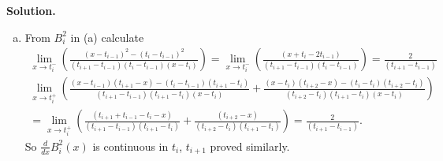\documentclass[a4paper]{book}
\newenvironment{solution}%
{\noindent\textbf{Solution.}}%
{\qedhere}
\numberwithin{equation}{chapter}
\theoremstyle{definition}
\begin{document}
\begin{solution}
\begin{enumerate}[(a)]
  \item From $B_i^2$ in (a) calculate
    \begin{align*}
      \lim\limits_{x \rightarrow t_i^-}(\frac{(x - t_{i-1})^2 - (t_i - t_{i-1})^2}{(t_{i+1} - t_{i-1})(t_i - t_{i-1})(x - t_i)}) =  \lim\limits_{x \rightarrow t_i^-}(\frac{(x + t_i - 2t_{i-1})}{(t_{i+1} - t_{i-1})(t_i - t_{i-1})}) = \frac{2}{(t_{i+1} - t_{i-1})} \\
      \lim\limits_{x \rightarrow t_i^+}( \frac{(x - t_{i-1})(t_{i+1} - x) - (t_i - t_{i-1})(t_{i+1} - t_i)}{(t_{i+1} - t_{i-1})(t_{i+1} - t_i)(x - t_{i})} + \frac{(x - t_{i})(t_{i+2} - x)- (t_i - t_{i})(t_{i+2} - t_i)}{(t_{i+2} - t_{i})(t_{i+1} - t_i)(x -t_{i})})\\
      = \lim\limits_{x \rightarrow t_i^+}( \frac{(t_{i+1} + t_{i-1} - t_i - x)}{(t_{i+1} - t_{i-1})(t_{i+1} - t_i)} + \frac{(t_{i+2} - x)}{(t_{i+2} - t_{i})(t_{i+1} - t_i)}) = \frac{2}{(t_{i+1} - t_{i-1})}.
    \end{align*}
    So $\frac{d}{dx}B_i^2(x)$ is continuous in $t_i$, $t_{i+1}$ proved similarly.


\end{enumerate}
\end{solution}
\end{document}

